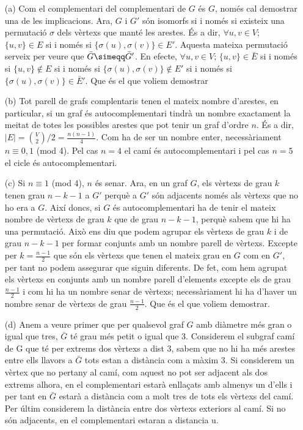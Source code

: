 \documentclass[10pt]{article}
\begin{document}
\begin{itemize}
  \item[(a)] Com el complementari del complementari de $G$ és $G$, només cal demostrar una de les implicacions. Ara, $G$ i $G'$ són isomorfs si i només si existeix una permutació $\sigma$ dels vèrtexs que manté les arestes. És a dir, $\forall u, v \in V$; $\{u, v\} \in E$ si i només si $\{\sigma(u), \sigma(v)\} \in E'$. Aquesta mateixa permutació serveix per veure que $\bar{G}\simeqq \bar{G}'$. En efecte, $\forall u, v \in V$; $\{u, v\} \in \bar{E}$ si i només si $\{u, v\} \notin E$ si i només si $\{\sigma(u), \sigma(v)\} \notin E'$ si i només si $\{\sigma(u), \sigma(v)\} \in \bar{E}'$. Que és el que voliem demostrar
  \item[(b)] Tot parell de grafs complentaris tenen el mateix nombre d'arestes, en particular, si un graf és autocomplementari tindrà un nombre exactament la meitat de totes les possibles arestes que pot tenir un graf d'ordre $n$. És a dir, $|E|={{V}\choose{2}}/2 = \frac{n(n-1)}{4}$. Com ha de ser un nombre enter, necessàriament $n\equiv0,1$ (mod 4). Pel cas $n=4$ el camí és autocomplementari i pel cas $n=5$ el cicle és autocomplementari.
  \item[(c)] Si $n\equiv1$ (mod 4), $n$ és senar. Ara, en un graf $G$, els vèrtexs de grau $k$ tenen grau $n-k-1$ a $G'$ perquè a $G'$ són adjacents només als vèrtexs que no ho era a $G$. Així doncs, si $G$ és autocomplementari ha de tenir el mateix nombre de vèrtexs de grau $k$ que de grau $n-k-1$, perquè sabem que hi ha una permutació. Això ens diu que podem agrupar els vèrtexs de grau $k$ i de grau $n-k-1$ per formar conjunts amb un nombre parell de vèrtexs. Excepte per $k=\frac{n-1}{2}$ que són els vèrtexs que tenen el mateix grau en $G$ com en $G'$, per tant no podem assegurar que siguin diferents. De fet, com hem agrupat els vèrtexs en conjunts amb un nombre parell d'elements excepte els de grau $\frac{n-1}{2}$ i com hi ha un nombre senar de vèrtexs; necessàriament hi ha d'haver un nombre senar de vèrtexs de grau $\frac{n-1}{2}$. Que és el que voliem demostrar.
  \item[(d)] Anem a veure primer que per qualsevol graf $G$ amb diàmetre més gran o igual que tres, $\bar{G}$ té grau més petit o igual que 3. Considerem el subgraf camí de G que té per extrems dos vèrtexs a dist 3, sabem que no hi ha més arestes entre ells llavors a $\bar{G}$ tots estan a distància com a màxim 3. Si considerem un vèrtex que no pertany al camí, com aquest no pot ser adjacent als dos extrems alhora, en el complementari estarà enllaçats amb almenys un d'ells i per tant en $\bar{G}$ estarà a distància com a molt tres de tots els vèrtexs del camí. Per últim considerem la distància entre dos vèrtexs exteriors al camí. Si no són adjacents, en el complementari estaran a distancia u.



\end{itemize}
\end{document}
